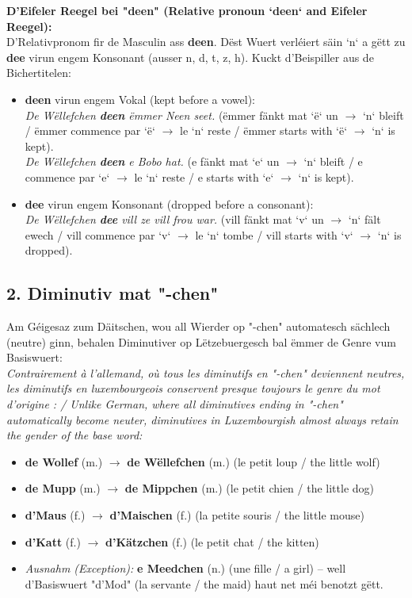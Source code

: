 \noindent\textbf{D'Eifeler Reegel bei "deen" (Relative pronoun `deen` and Eifeler Reegel):} \\
D'Relativpronom fir de Masculin ass \textbf{deen}. Dëst Wuert verléiert säin `n` a gëtt zu \textbf{dee} virun engem Konsonant (ausser n, d, t, z, h). Kuckt d'Beispiller aus de Bichertitelen:
\begin{itemize}
    \item \textbf{deen} virun engem Vokal (kept before a vowel): \\
    \textit{De Wëllefchen \textbf{deen} ëmmer Neen seet.} (ëmmer fänkt mat `ë` un $\rightarrow$ `n` bleift / ëmmer commence par `ë` $\rightarrow$ le `n` reste / ëmmer starts with `ë` $\rightarrow$ `n` is kept). \\
    \textit{De Wëllefchen \textbf{deen} e Bobo hat.} (e fänkt mat `e` un $\rightarrow$ `n` bleift / e commence par `e` $\rightarrow$ le `n` reste / e starts with `e` $\rightarrow$ `n` is kept).
    \item \textbf{dee} virun engem Konsonant (dropped before a consonant): \\
    \textit{De Wëllefchen \textbf{dee} vill ze vill frou war.} (vill fänkt mat `v` un $\rightarrow$ `n` fält ewech / vill commence par `v` $\rightarrow$ le `n` tombe / vill starts with `v` $\rightarrow$ `n` is dropped).
\end{itemize}

\subsection*{2. Diminutiv mat "-chen"}

Am Géigesaz zum Däitschen, wou all Wierder op "-chen" automatesch sächlech (neutre) ginn, behalen Diminutiver op Lëtzebuergesch bal ëmmer de Genre vum Basiswuert: \\
\textit{Contrairement à l'allemand, où tous les diminutifs en "-chen" deviennent neutres, les diminutifs en luxembourgeois conservent presque toujours le genre du mot d'origine : / Unlike German, where all diminutives ending in "-chen" automatically become neuter, diminutives in Luxembourgish almost always retain the gender of the base word:}
\begin{itemize}
    \item \textbf{de Wollef} (m.) $\rightarrow$ \textbf{de Wëllefchen} (m.) (le petit loup / the little wolf)
    \item \textbf{de Mupp} (m.) $\rightarrow$ \textbf{de Mippchen} (m.) (le petit chien / the little dog)
    \item \textbf{d'Maus} (f.) $\rightarrow$ \textbf{d'Maischen} (f.) (la petite souris / the little mouse)
    \item \textbf{d'Katt} (f.) $\rightarrow$ \textbf{d'Kätzchen} (f.) (le petit chat / the kitten)
    \item \textit{Ausnahm (Exception):} \textbf{e Meedchen} (n.) (une fille / a girl) -- well d'Basiswuert "d'Mod" (la servante / the maid) haut net méi benotzt gëtt.
\end{itemize}

